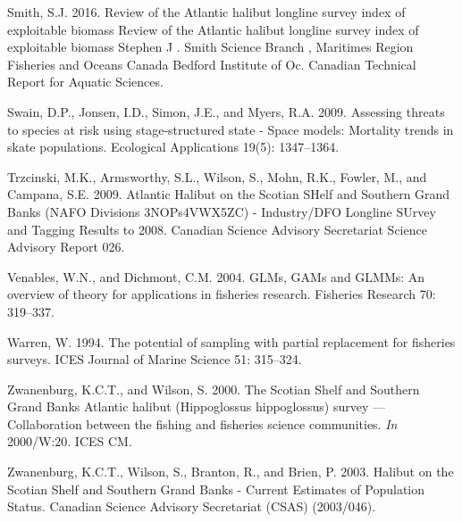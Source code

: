 \documentclass[12pt]{article}\usepackage[]{graphicx}\usepackage[]{color}
\begin{document}
\leavevmode\hypertarget{ref-Smith2016a}{}%
Smith, S.J. 2016. Review of the Atlantic halibut longline survey index of exploitable biomass Review of the Atlantic halibut longline survey index of exploitable biomass Stephen J . Smith Science Branch , Maritimes Region Fisheries and Oceans Canada Bedford Institute of Oc. Canadian Technical Report for Aquatic Sciences.

\leavevmode\hypertarget{ref-Swain2009}{}%
Swain, D.P., Jonsen, I.D., Simon, J.E., and Myers, R.A. 2009. Assessing threats to species at risk using stage-structured state - Space models: Mortality trends in skate populations. Ecological Applications 19(5): 1347--1364.

\leavevmode\hypertarget{ref-Trzcinski2009}{}%
Trzcinski, M.K., Armsworthy, S.L., Wilson, S., Mohn, R.K., Fowler, M., and Campana, S.E. 2009. Atlantic Halibut on the Scotian SHelf and Southern Grand Banks (NAFO Divisions 3NOPs4VWX5ZC) - Industry/DFO Longline SUrvey and Tagging Results to 2008. Canadian Science Advisory Secretariat Science Advisory Report 026.

\leavevmode\hypertarget{ref-Venables2004}{}%
Venables, W.N., and Dichmont, C.M. 2004. GLMs, GAMs and GLMMs: An overview of theory for applications in fisheries research. Fisheries Research 70: 319--337.

\leavevmode\hypertarget{ref-Warren1994}{}%
Warren, W. 1994. The potential of sampling with partial replacement for fisheries surveys. ICES Journal of Marine Science 51: 315--324.

\leavevmode\hypertarget{ref-Zwanenburg2000}{}%
Zwanenburg, K.C.T., and Wilson, S. 2000. The Scotian Shelf and Southern Grand Banks Atlantic halibut (Hippoglossus hippoglossus) survey --- Collaboration between the fishing and fisheries science communities. \emph{In} 2000/W:20. ICES CM.

\leavevmode\hypertarget{ref-Zwanenburg2003}{}%
Zwanenburg, K.C.T., Wilson, S., Branton, R., and Brien, P. 2003. Halibut on the Scotian Shelf and Southern Grand Banks - Current Estimates of Population Status. Canadian Science Advisory Secretariat (CSAS) (2003/046).
\end{document}
